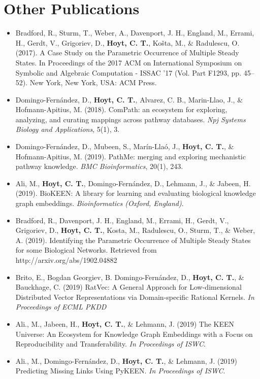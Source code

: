 \section*{Other Publications}

\begin{itemize}
    \item Bradford, R., Sturm, T., Weber, A., Davenport, J. H., England, M., Errami, H., Gerdt, V., Grigoriev, D., \textbf{Hoyt, C. T.}, Košta, M., \& Radulescu, O. (2017). A Case Study on the Parametric Occurrence of Multiple Steady States. In Proceedings of the 2017 ACM on International Symposium on Symbolic and Algebraic Computation - ISSAC ’17 (Vol. Part F1293, pp. 45–52). New York, New York, USA: ACM Press.
    \item Domingo-Fern\'{a}ndez, D., \textbf{Hoyt, C. T.}, Alvarez, C. B., Marin-Llao, J., \& Hofmann-Apitius, M. (2018). ComPath: an ecosystem for exploring, analyzing, and curating mappings across pathway databases. \textit{Npj Systems Biology and Applications}, 5(1), 3.
    \item Domingo-Fern\'{a}ndez, D., Mubeen, S., Marín-Llaó, J., \textbf{Hoyt, C. T.}, \& Hofmann-Apitius, M. (2019). PathMe: merging and exploring mechanistic pathway knowledge. \textit{BMC Bioinformatics}, 20(1), 243.
    \item Ali, M., \textbf{Hoyt, C. T.}, Domingo-Fern\'{a}ndez, D., Lehmann, J., \& Jabeen, H. (2019). BioKEEN: A library for learning and evaluating biological knowledge graph embeddings. \textit{Bioinformatics (Oxford, England)}.
    \item Bradford, R., Davenport, J. H., England, M., Errami, H., Gerdt, V., Grigoriev, D., \textbf{Hoyt, C. T.}, Kosta, M., Radulescu, O., Sturm, T., \& Weber, A. (2019). Identifying the Parametric Occurrence of Multiple Steady States for some Biological Networks. Retrieved from http://arxiv.org/abs/1902.04882
    \item Brito, E., Bogdan Georgiev, B. Domingo-Fern\'{a}ndez, D., \textbf{Hoyt, C. T.}, \& Bauckhage, C. (2019) RatVec: A General Approach for Low-dimensional Distributed Vector Representations via Domain-specific Rational Kernels. \textit{In Proceedings of ECML PKDD}
    \item Ali., M., Jabeen, H., \textbf{Hoyt, C. T.}, \& Lehmann, J. (2019) The KEEN Universe: An Ecosystem for Knowledge Graph Embeddings with a Focus on Reproducibility and Transferability. \textit{In Proceedings of ISWC}.
    \item Ali., M., Domingo-Fern\'{a}ndez, D., \textbf{Hoyt, C. T.}, \& Lehmann, J. (2019) Predicting Missing Links Using PyKEEN. \textit{In Proceedings of ISWC}.

\end{itemize}
